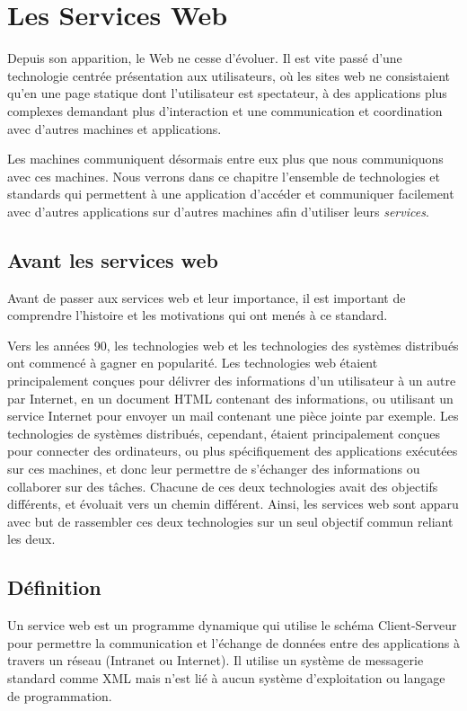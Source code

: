 \chapter{Les Services Web}

Depuis son apparition, le Web ne cesse d'évoluer. Il est vite passé d'une technologie centrée présentation aux utilisateurs, où les sites web ne consistaient qu'en une page statique dont l'utilisateur est spectateur, à des applications plus complexes demandant plus d'interaction et une communication et coordination avec d'autres machines et applications.

Les machines communiquent désormais entre eux plus que nous communiquons avec ces machines.
Nous verrons dans ce chapitre l'ensemble de technologies et standards qui permettent à une application d'accéder et communiquer facilement avec d'autres applications sur d'autres machines afin d'utiliser leurs \emph{services}.
		
\section{Avant les services web}
Avant de passer aux services web et leur importance, il est important de comprendre l'histoire et les motivations qui ont menés à ce standard.
		
Vers les années 90, les technologies web et les technologies des systèmes distribués ont commencé à gagner en popularité. Les technologies web étaient principalement conçues pour délivrer des informations d'un utilisateur à un autre par Internet, en un document HTML contenant des informations, ou utilisant un service Internet pour envoyer un mail contenant une pièce jointe par exemple. 
Les technologies de systèmes distribués, cependant, étaient principalement conçues pour connecter des ordinateurs, ou plus spécifiquement des applications exécutées sur ces machines, et donc leur permettre de s'échanger des informations ou collaborer sur des tâches.
Chacune de ces deux technologies avait des objectifs différents, et évoluait vers un chemin différent. Ainsi, les services web sont apparu avec but de rassembler ces deux technologies sur un seul objectif commun reliant les deux\cite{W3Road}.

\section{Définition}
Un service web est un programme dynamique qui utilise le schéma Client-Serveur pour permettre la communication et l'échange de données entre des applications à travers un réseau (Intranet ou Internet).
Il utilise un système de messagerie standard comme XML mais n'est lié à aucun système d'exploitation ou langage de programmation.

